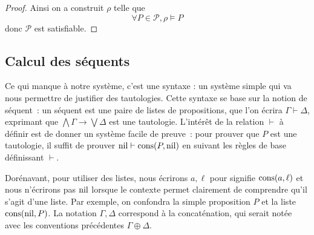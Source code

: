 \begin{proof}
  Ainsi on a construit $\rho$ telle que
  \[\forall P \in\mathcal P, \rho\models P\]
  donc $\mathcal P$ est satisfiable.
\end{proof}

\subsection{Calcul des séquents}

Ce qui manque à notre système, c'est une syntaxe : un système simple qui va nous
permettre de justifier des tautologies. Cette syntaxe se base sur la notion de
séquent~: un séquent est une paire de listes de propositions, que l'on écrira
$\Gamma\vdash \Delta$, exprimant que $\bigwedge \Gamma \to \bigvee \Delta$ est
une tautologie. L'intérêt de la relation $\vdash$ à définir est de donner un
système facile de preuve~: pour prouver que $P$ est une tautologie, il suffit
de prouver $\operatorname{nil}\vdash \operatorname{cons}(P,\operatorname{nil})$ en suivant les règles de base définissant
$\vdash$.

\begin{notation}
  Dorénavant, pour utiliser des listes, nous écrirons $a, \ell$ pour signifie
  $\operatorname{cons}(a,\ell)$ et nous n'écrirons pas $\operatorname{nil}$ lorsque le contexte permet
  clairement de comprendre qu'il s'agit d'une liste. Par exemple, on confondra
  la simple proposition $P$ et la liste $\operatorname{cons}(\operatorname{nil},P)$. La notation
  $\Gamma,\Delta$ correspond à la concaténation, qui serait notée avec les
  conventions précédentes $\Gamma\oplus\Delta$.
\end{notation}


